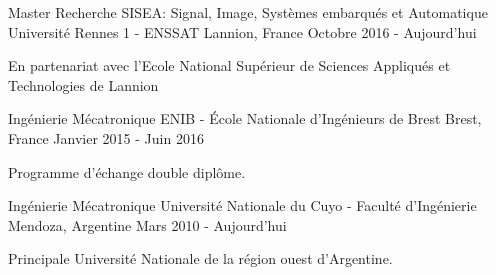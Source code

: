 
\begin{cventries}

\cventry
{Master Recherche SISEA: Signal, Image, Systèmes embarqués et Automatique} %
{Université Rennes 1 - ENSSAT }
{Lannion, France} %
{Octobre 2016 - Aujourd'hui} %
{
	\begin{cvitems} %
		\item {En partenariat avec l'Ecole National Supérieur de Sciences Appliqués et Technologies de Lannion}
	\end{cvitems}
}
\cventry
{Ingénierie Mécatronique} %
{ENIB - École Nationale d'Ingénieurs de Brest} %
{Brest, France} %
{Janvier 2015 - Juin 2016} %
{
  \begin{cvitems} %
    \item {Programme d'échange double diplôme.}
  \end{cvitems}
}

\cventry
{Ingénierie Mécatronique} %
{Université Nationale du Cuyo - Faculté d'Ingénierie} %
{Mendoza, Argentine} %
{Mars 2010 - Aujourd'hui} %
{
	\begin{cvitems} %
		\item {Principale Université Nationale de la région ouest d'Argentine.}
	\end{cvitems}
}







\end{cventries}
